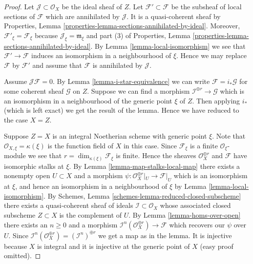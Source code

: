 \begin{proof}
Let $\mathcal{J} \subset \mathcal{O}_X$ be the ideal sheaf of $Z$.
Let $\mathcal{F}' \subset \mathcal{F}$ be the subsheaf of
local sections of $\mathcal{F}$ which are annihilated by
$\mathcal{J}$. It is a quasi-coherent sheaf by
Properties, Lemma \ref{properties-lemma-sections-annihilated-by-ideal}.
Moreover, $\mathcal{F}'_\xi = \mathcal{F}_\xi$ because
$\mathcal{J}_\xi = \mathfrak m_\xi$ and part (3) of
Properties, Lemma \ref{properties-lemma-sections-annihilated-by-ideal}.
By Lemma \ref{lemma-local-isomorphism} we see that
$\mathcal{F}' \to \mathcal{F}$
induces an isomorphism in a neighbourhood of $\xi$.
Hence we may replace $\mathcal{F}$ by $\mathcal{F}'$ and assume
that $\mathcal{F}$ is annihilated by $\mathcal{J}$.

\medskip\noindent
Assume $\mathcal{J}\mathcal{F} = 0$. By
Lemma \ref{lemma-i-star-equivalence} we can write
$\mathcal{F} = i_*\mathcal{G}$ for some coherent
sheaf $\mathcal{G}$ on $Z$. Suppose we can find a morphism
$\mathcal{I}^{\oplus r} \to \mathcal{G}$ which is an isomorphism
in a neighbourhood of the generic point $\xi$ of $Z$.
Then applying $i_*$ (which is left exact) we get the result of the lemma.
Hence we have reduced to the case $X = Z$.

\medskip\noindent
Suppose $Z = X$ is an integral Noetherian scheme with generic point $\xi$.
Note that $\mathcal{O}_{X, \xi} = \kappa(\xi)$ is the function field of $X$
in this case.
Since $\mathcal{F}_\xi$ is a finite $\mathcal{O}_\xi$-module we see
that $r = \dim_{\kappa(\xi)} \mathcal{F}_\xi$ is finite.
Hence the sheaves $\mathcal{O}_X^{\oplus r}$ and $\mathcal{F}$
have isomorphic stalks at $\xi$.
By Lemma \ref{lemma-map-stalks-local-map} there exists a nonempty
open $U \subset X$ and a morphism
$\psi : \mathcal{O}_X^{\oplus r}|_U \to \mathcal{F}|_U$
which is an isomorphism
at $\xi$, and hence an isomorphism in a neighbourhood of $\xi$ by
Lemma \ref{lemma-local-isomorphism}.
By Schemes, Lemma \ref{schemes-lemma-reduced-closed-subscheme}
there exists a quasi-coherent sheaf of ideals
$\mathcal{I} \subset \mathcal{O}_X$
whose associated closed subscheme $Z \subset X$ is the complement
of $U$.
By Lemma \ref{lemma-homs-over-open} there exists an $n \geq 0$ and a morphism
$\mathcal{I}^n(\mathcal{O}_X^{\oplus r}) \to \mathcal{F}$
which recovers our $\psi$ over $U$. Since
$\mathcal{I}^n(\mathcal{O}_X^{\oplus r}) = (\mathcal{I}^n)^{\oplus r}$
we get a map as in the lemma. It is injective because $X$ is
integral and it is injective at the generic point of $X$
(easy proof omitted).
\end{proof}

